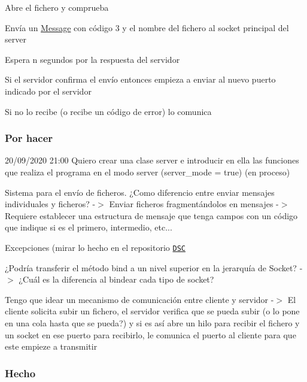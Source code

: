 \begin{DoxyEnumerate}
\item Abre el fichero y comprueba
\item Envía un \hyperlink{structMessage}{Message} con código 3 y el nombre del fichero al socket principal del server
\item Espera n segundos por la respuesta del servidor
\item 
\begin{DoxyItemize}
\item Si el servidor confirma el envío entonces empieza a enviar al nuevo puerto indicado por el servidor
\item Si no lo recibe (o recibe un código de error) lo comunica
\end{DoxyItemize}
\end{DoxyEnumerate}

\subsubsection*{Por hacer}


\begin{DoxyItemize}
\item 20/09/2020 21\+:00 Quiero crear una clase server e introducir en ella las funciones que realiza el programa en el modo server (server\+\_\+mode = true) (en proceso)
\item Sistema para el envío de ficheros. ¿\+Como diferencio entre enviar mensajes individuales y ficheros? -\/$>$ Enviar ficheros fragmentándolos en mensajes -\/$>$ Requiere establecer una estructura de mensaje que tenga campos con un código que indique si es el primero, intermedio, etc...
\item Excepciones (mirar lo hecho en el repositorio \href{https://github.com/miguel-martinr/Data-Structure-Classes}{\tt D\+SC}
\item ¿\+Podría transferir el método bind a un nivel superior en la jerarquía de Socket? -\/$>$ ¿\+Cuál es la diferencia al bindear cada tipo de socket?
\item Tengo que idear un mecanismo de comunicación entre cliente y servidor -\/$>$ El cliente solicita subir un fichero, el servidor verifica que se pueda subir (o lo pone en una cola hasta que se pueda?) y si es así abre un hilo para recibir el fichero y un socket en ese puerto para recibirlo, le comunica el puerto al cliente para que este empieze a transmitir
\end{DoxyItemize}

\subsubsection*{Hecho}


